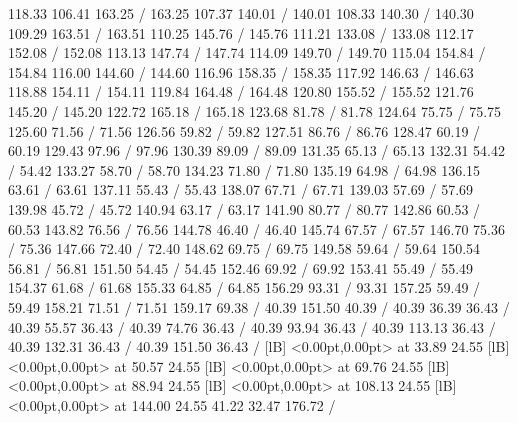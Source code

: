 { 118.33 106.41 163.25 /
 163.25 107.37 140.01 /
 140.01 108.33 140.30 /
 140.30 109.29 163.51 /
 163.51 110.25 145.76 /
 145.76 111.21 133.08 /
 133.08 112.17 152.08 /
 152.08 113.13 147.74 /
 147.74 114.09 149.70 /
 149.70 115.04 154.84 /
 154.84 116.00 144.60 /
 144.60 116.96 158.35 /
 158.35 117.92 146.63 /
 146.63 118.88 154.11 /
 154.11 119.84 164.48 /
 164.48 120.80 155.52 /
 155.52 121.76 145.20 /
 145.20 122.72 165.18 /
 165.18 123.68 81.78 /
 81.78 124.64 75.75 /
 75.75 125.60 71.56 /
 71.56 126.56 59.82 /
 59.82 127.51 86.76 /
 86.76 128.47 60.19 /
 60.19 129.43 97.96 /
 97.96 130.39 89.09 /
 89.09 131.35 65.13 /
 65.13 132.31 54.42 /
 54.42 133.27 58.70 /
 58.70 134.23 71.80 /
 71.80 135.19 64.98 /
 64.98 136.15 63.61 /
 63.61 137.11 55.43 /
 55.43 138.07 67.71 /
 67.71 139.03 57.69 /
 57.69 139.98 45.72 /
 45.72 140.94 63.17 /
 63.17 141.90 80.77 /
 80.77 142.86 60.53 /
 60.53 143.82 76.56 /
 76.56 144.78 46.40 /
 46.40 145.74 67.57 /
 67.57 146.70 75.36 /
 75.36 147.66 72.40 /
 72.40 148.62 69.75 /
 69.75 149.58 59.64 /
 59.64 150.54 56.81 /
 56.81 151.50 54.45 /
 54.45 152.46 69.92 /
 69.92 153.41 55.49 /
 55.49 154.37 61.68 /
 61.68 155.33 64.85 /
 64.85 156.29 93.31 /
 93.31 157.25 59.49 /
 59.49 158.21 71.51 /
 71.51 159.17 69.38 /
\setsolid
{} 40.39 151.50 40.39 /
\setsolid
{} 40.39 36.39 36.43 /
\setsolid
{} 40.39 55.57 36.43 /
\setsolid
{} 40.39 74.76 36.43 /
\setsolid
{} 40.39 93.94 36.43 /
\setsolid
{} 40.39 113.13 36.43 /
\setsolid
{} 40.39 132.31 36.43 /
\setsolid
{} 40.39 151.50 36.43 /
  [lB] <0.00pt,0.00pt> at 33.89 24.55
  [lB] <0.00pt,0.00pt> at 50.57 24.55
  [lB] <0.00pt,0.00pt> at 69.76 24.55
  [lB] <0.00pt,0.00pt> at 88.94 24.55
  [lB] <0.00pt,0.00pt> at 108.13 24.55
  [lB] <0.00pt,0.00pt> at 144.00 24.55
\setsolid
{} 41.22 32.47 176.72 /
}
